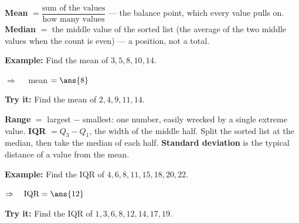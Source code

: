 \documentclass[12pt]{article}
\begin{document}


\begin{formulabox}
\textbf{Mean} $= \dfrac{\text{sum of the values}}{\text{how many values}}$ --- the balance point,
which every value pulls on. \quad \textbf{Median} $=$ the middle value of the sorted list
(the average of the two middle values when the count is even) --- a position, not a total.
\end{formulabox}

\begin{examplebox}
\textbf{Example:} \quad Find the mean of $3, 5, 8, 10, 14$.

$\Rightarrow\quad$ mean $= \ans{8}$
\end{examplebox}

\begin{tryitbox}
\textbf{Try it:} \quad Find the mean of $2, 4, 9, 11, 14$.\\[2pt]
\end{tryitbox}


\begin{formulabox}
\textbf{Range} $=$ largest $-$ smallest: one number, easily wrecked by a single extreme value.
\quad \textbf{IQR} $= Q_3 - Q_1$, the width of the middle half. Split the sorted list at the
median, then take the median of each half. \quad \textbf{Standard deviation} is the typical
distance of a value from the mean.
\end{formulabox}

\begin{examplebox}
\textbf{Example:} \quad Find the IQR of $4, 6, 8, 11, 15, 18, 20, 22$.

$\Rightarrow\quad \text{IQR} = \ans{12}$
\end{examplebox}

\begin{tryitbox}
\textbf{Try it:} \quad Find the IQR of $1, 3, 6, 8, 12, 14, 17, 19$.\\[2pt]
\end{tryitbox}
\end{document}
